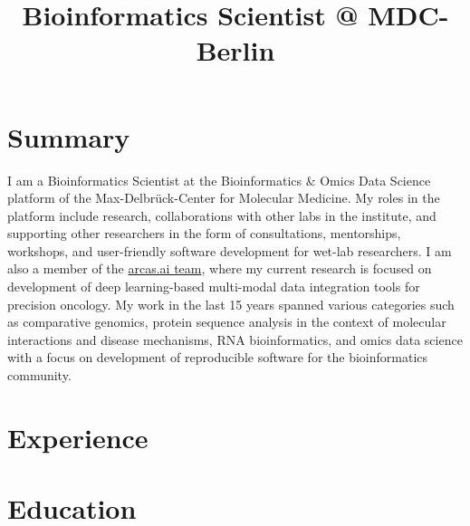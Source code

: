 \documentclass[11pt,a4paper,sans]{moderncv}
\title{Bioinformatics Scientist @ MDC-Berlin}                   %
\begin{document}
\makecvtitle

\section{Summary}
I am a Bioinformatics Scientist at the Bioinformatics \& Omics Data Science platform of the Max-Delbrück-Center for Molecular Medicine. My roles in the platform include research, collaborations with other labs in the institute, and supporting other researchers in the form of consultations, mentorships, workshops, and user-friendly software development for wet-lab researchers. I am also a member of the \href{https://arcas.ai/about-us}{arcas.ai team}, where my current research is focused on development of deep learning-based multi-modal data integration tools for precision oncology. My work in the last 15 years spanned various categories such as comparative genomics, protein sequence analysis in the context of molecular interactions and disease mechanisms, RNA bioinformatics, and omics data science with a focus on development of reproducible software for the bioinformatics community.

\section{Experience}


\section{Education}
\end{document}
